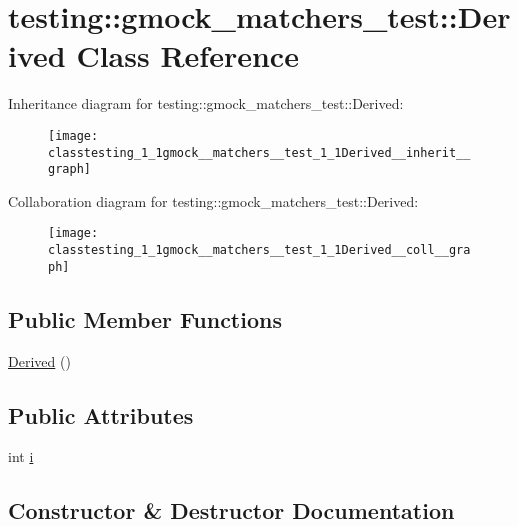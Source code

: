 \hypertarget{classtesting_1_1gmock__matchers__test_1_1Derived}{}\section{testing\+:\+:gmock\+\_\+matchers\+\_\+test\+:\+:Derived Class Reference}
\label{classtesting_1_1gmock__matchers__test_1_1Derived}


Inheritance diagram for testing\+:\+:gmock\+\_\+matchers\+\_\+test\+:\+:Derived\+:\nopagebreak
\begin{figure}[H]
\begin{center}
\leavevmode
\texttt{[image: classtesting\_1\_1gmock\_\_matchers\_\_test\_1\_1Derived\_\_inherit\_\_graph]}
\end{center}
\end{figure}


Collaboration diagram for testing\+:\+:gmock\+\_\+matchers\+\_\+test\+:\+:Derived\+:\nopagebreak
\begin{figure}[H]
\begin{center}
\leavevmode
\texttt{[image: classtesting\_1\_1gmock\_\_matchers\_\_test\_1\_1Derived\_\_coll\_\_graph]}
\end{center}
\end{figure}
\subsection*{Public Member Functions}
\begin{DoxyCompactItemize}
\item 
\hyperlink{classtesting_1_1gmock__matchers__test_1_1Derived_a3de17d9e4bfb19dcafb88d3cccbbeaf2}{Derived} ()
\end{DoxyCompactItemize}
\subsection*{Public Attributes}
\begin{DoxyCompactItemize}
\item 
int \hyperlink{classtesting_1_1gmock__matchers__test_1_1Derived_a357d6747c44d7af7159fb5898a782f1b}{i}
\end{DoxyCompactItemize}


\subsection{Constructor \& Destructor Documentation}

